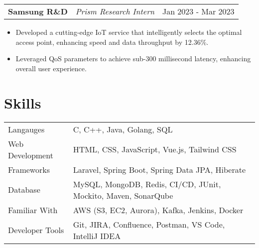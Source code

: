 \documentclass[a4paper,10pt]{article}
\makeatletter
\newenvironment{joblong}[3]
    {
    \begin{tabularx}{\linewidth}{@{}l X r@{}}
    \textbf{#1} & \textit{#2} &  #3 \\[3pt]
    \end{tabularx}
    \begin{minipage}[t]{\linewidth}
    \begin{itemize}[nosep,after=\strut, leftmargin=1em, itemsep=2pt,label=--]
    }
    {
    \end{itemize}
    \end{minipage}    
    }
\makeatother
\begin{document}


\begin{joblong}{Samsung R\&D}{Prism Research Intern}{Jan 2023 - Mar 2023}
    \item Developed a cutting-edge IoT service that intelligently selects the optimal access point, enhancing speed and data throughput by 12.36\%.
    \item Leveraged QoS parameters to achieve sub-300 millisecond latency, enhancing overall user experience.
\end{joblong}
\vspace{-5pt}

\section{Skills}
\vspace{-4pt}
\begin{tabularx}{\linewidth}{@{}l X@{}}
Langauges &  \normalsize{C, C++, Java, Golang, SQL}\\
Web Development & \normalsize{HTML, CSS, JavaScript, Vue.js, Tailwind CSS}\\
Frameworks &  \normalsize{Laravel, Spring Boot, Spring Data JPA, Hiberate}\\
Database & \normalsize{MySQL, MongoDB, Redis, CI/CD, JUnit, Mockito, Maven, SonarQube}\\
Familiar With & \normalsize{AWS (S3, EC2, Aurora), Kafka, Jenkins, Docker}\\
Developer Tools & \normalsize{Git, JIRA, Confluence, Postman, VS Code, IntelliJ IDEA}\\
\end{tabularx}
\end{document}
